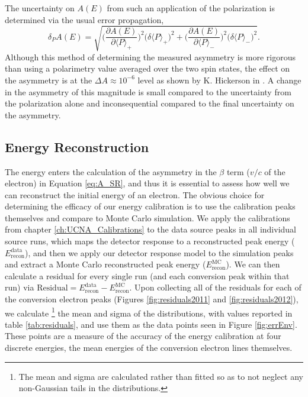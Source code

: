 The uncertainty on $A(E)$ from such an application of the polarization is determined via
the usual error propagation,
%
\begin{equation}
  \delta_PA(E) = \sqrt{\bigg(\frac{\partial A(E)}{\partial \langle P \rangle_+}\bigg)^2
    \Big(\delta \langle P \rangle_+\Big)^2 +
    \bigg( \frac{\partial A(E)}{\partial \langle P \rangle_-}\bigg)^2
    \Big(\delta \langle P \rangle_-\Big)^2}.
\end{equation}
%
Although this method of determining the measured asymmetry is more rigorous than using a
polarimetry value averaged over the two spin states, the effect on the asymmetry is
at the $\Delta A \approx 10^{-6}$ level as shown by K. Hickerson in \cite{hickerson2013}.
A change in the asymmetry of this magnitude is small compared to the uncertainty from
the polarization alone and inconsequential compared
to the final uncertainty on the asymmetry. 


\subsection{Energy Reconstruction} \label{ssec:energyRecon}

The energy enters the calculation of the asymmetry in the $\beta$ term ($v/c$ of the
electron) in Equation \ref{eq:A_SR}, and thus it is essential to assess how well
we can reconstruct the initial energy of an electron. The obvious choice for determining
the efficacy of our energy calibration is to use the calibration peaks themselves and
compare to Monte Carlo simulation. We apply the calibrations from
chapter \ref{ch:UCNA_Calibrations} to the data source peaks in all
individual source runs,
which maps the detector response to a reconstructed peak energy ($E_{\mathrm{recon}}^{\mathrm{data}}$),
and then we apply our
detector response model to the simulation peaks and extract a Monte Carlo reconstructed peak energy
($E_{\mathrm{recon}}^{\mathrm{MC}}$). We can then calculate a residual for every single run (and each
conversion peak within that run) via
$\mathrm{Residual} = E_{\mathrm{recon}}^{\mathrm{data}} - E_{\mathrm{recon}}^{\mathrm{MC}}$. Upon collecting all
of the residuals for each of the conversion electron peaks (Figures \ref{fig:residuals2011}
and \ref{fig:residuals2012}), we calculate
\footnote{ \label{fn:sourceMean}The mean and sigma are calculated rather than fitted so as to not neglect any
  non-Gaussian tails in the distributions.} the mean and sigma of the distributions, with
values reported in table \ref{tab:residuals}, and use
them as the data points seen in Figure \ref{fig:errEnv}. These points are a measure
of the accuracy of the energy calibration at four discrete energies, the mean energies of the
conversion electron lines themselves.

